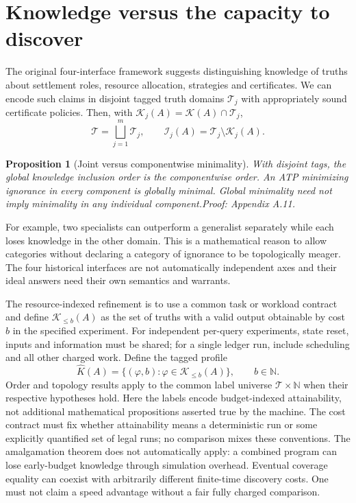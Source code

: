 \documentclass[11pt]{article}
\newtheorem{proposition}[theorem]{Proposition}
\newcommand{\T}{\mathcal T}\newcommand{\K}{\mathcal K}\newcommand{\I}{\mathcal I}\newcommand{\A}{\mathcal A}
\newcommand{\pf}[1]{\unskip\hspace{.6em plus 1fill}\textit{Proof: Appendix A.#1.}}
\begin{document}
\section{Knowledge versus the capacity to discover}
The original four-interface framework \cite{dreamer} suggests distinguishing knowledge of truths about settlement roles, resource allocation, strategies and certificates. We can encode such claims in disjoint tagged truth domains $\T_j$ with appropriately sound certificate policies. Then, with $\K_j(A)=\K(A)\cap\T_j$,
\[
\T=\bigsqcup_{j=1}^m\T_j,\qquad \I_j(A)=\T_j\setminus\K_j(A).
\]
\begin{proposition}[Joint versus componentwise minimality]\label{th:category}
With disjoint tags, the global knowledge inclusion order is the componentwise order. An ATP minimizing ignorance in every component is globally minimal. Global minimality need not imply minimality in any individual component.\pf{11}
\end{proposition}
For example, two specialists can outperform a generalist separately while each loses knowledge in the other domain. This is a mathematical reason to allow categories without declaring a category of ignorance to be topologically meager. The four historical interfaces are not automatically independent axes and their ideal answers need their own semantics and warrants.

The resource-indexed refinement is to use a common task or workload contract and define $\K_{\le b}(A)$ as the set of truths with a valid output obtainable by cost $b$ in the specified experiment. For independent per-query experiments, state reset, inputs and information must be shared; for a single ledger run, include scheduling and all other charged work. Define the tagged profile
\[
\widehat K(A)=\{(\varphi,b):\varphi\in\K_{\le b}(A)\},\qquad b\in\mathbb N.
\]
Order and topology results apply to the common label universe $\T\times\mathbb N$ when their respective hypotheses hold. Here the labels encode budget-indexed attainability, not additional mathematical propositions asserted true by the machine. The cost contract must fix whether attainability means a deterministic run or some explicitly quantified set of legal runs; no comparison mixes these conventions. The amalgamation theorem does not automatically apply: a combined program can lose early-budget knowledge through simulation overhead. Eventual coverage equality can coexist with arbitrarily different finite-time discovery costs. One must not claim a speed advantage without a fair fully charged comparison.
\end{document}
